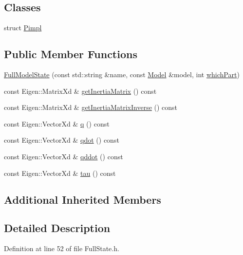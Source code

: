 \subsection*{Classes}
\begin{DoxyCompactItemize}
\item 
struct \hyperlink{structocra_1_1FullModelState_1_1Pimpl}{Pimpl}
\end{DoxyCompactItemize}
\subsection*{Public Member Functions}
\begin{DoxyCompactItemize}
\item 
\hyperlink{classocra_1_1FullModelState_a2fc326508bd940f338c614c18549a7ba}{Full\+Model\+State} (const std\+::string \&name, const \hyperlink{classocra_1_1Model}{Model} \&model, int \hyperlink{classocra_1_1FullState_a75ec7c039df8cb8608ebf34f7b779be5}{which\+Part})
\item 
const Eigen\+::\+Matrix\+Xd \& \hyperlink{classocra_1_1FullModelState_a988dec9567fd2b083ecfb6f3348d9a09}{get\+Inertia\+Matrix} () const
\item 
const Eigen\+::\+Matrix\+Xd \& \hyperlink{classocra_1_1FullModelState_adf7ce7128a112c3f2b6367b6c0f6b9a2}{get\+Inertia\+Matrix\+Inverse} () const
\item 
const Eigen\+::\+Vector\+Xd \& \hyperlink{classocra_1_1FullModelState_a3a560064b1be8bd1579382aa08686904}{q} () const
\item 
const Eigen\+::\+Vector\+Xd \& \hyperlink{classocra_1_1FullModelState_a034c567bae39a29f391f6462f52b0834}{qdot} () const
\item 
const Eigen\+::\+Vector\+Xd \& \hyperlink{classocra_1_1FullModelState_a2578e15742268c14fb4ce5f26033256e}{qddot} () const
\item 
const Eigen\+::\+Vector\+Xd \& \hyperlink{classocra_1_1FullModelState_aa774cf6a9a50ed4b50c037ae981d2c7b}{tau} () const
\end{DoxyCompactItemize}
\subsection*{Additional Inherited Members}


\subsection{Detailed Description}


Definition at line 52 of file Full\+State.\+h.



